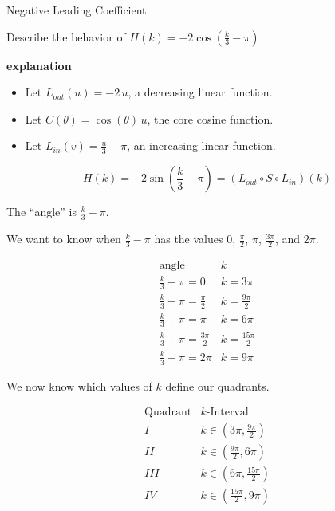 \documentclass{ximera}
\begin{document}
\begin{example} Negative Leading Coefficient

Describe the behavior of   $H(k) = -2 \cos\left( \frac{k}{3} - \pi \right)$



\textbf{\textcolor{red!75!green}{explanation}} 




\begin{itemize}
\item Let $L_{out}(u) = -2 \, u$, a decreasing linear function.
\item Let $C(\theta) = \cos(\theta)  \, u$, the core cosine function.
\item Let $L_{in}(v) = \frac{u}{3} - \pi$, an increasing linear function.
\end{itemize}



\[
H(k) = -2 \sin\left( \frac{k}{3} - \pi \right) = (L_{out} \circ S \circ L_{in})(k)
\]


The ``angle'' is $\frac{k}{3} - \pi$.

We want to know when $\frac{k}{3} - \pi$ has the values $0$, $\frac{\pi}{2}$, $\pi$, $\frac{3\pi}{2}$, and $2\pi$.






\[
\begin{array}{l|l}
\text{angle}                  & k  \\ \hline
\frac{k}{3} - \pi = 0        & k = 3 \pi  \\
\frac{k}{3} - \pi = \frac{\pi}{2}      &  k = \frac{9\pi}{2} \\
\frac{k}{3} - \pi = \pi      & k = 6 \pi  \\
\frac{k}{3} - \pi = \frac{3\pi}{2}     & k = \frac{15\pi}{2}   \\
\frac{k}{3} - \pi = 2\pi     & k = 9 \pi
\end{array}
\]


We now know which values of $k$ define our quadrants.





\[
\begin{array}{l|l}
\text{Quadrant}                  & k\text{-Interval}  \\  \hline
I        & k \in  \left( 3\pi, \frac{9\pi}{2} \right)  \\
II       & k \in  \left( \frac{9\pi}{2}, 6 \pi \right) \\
III      & k \in  \left( 6 \pi, \frac{15\pi}{2} \right)  \\
IV       & k \in  \left( \frac{15\pi}{2}, 9 \pi \right)   \\
\end{array}
\]




\end{example}
\end{document}
